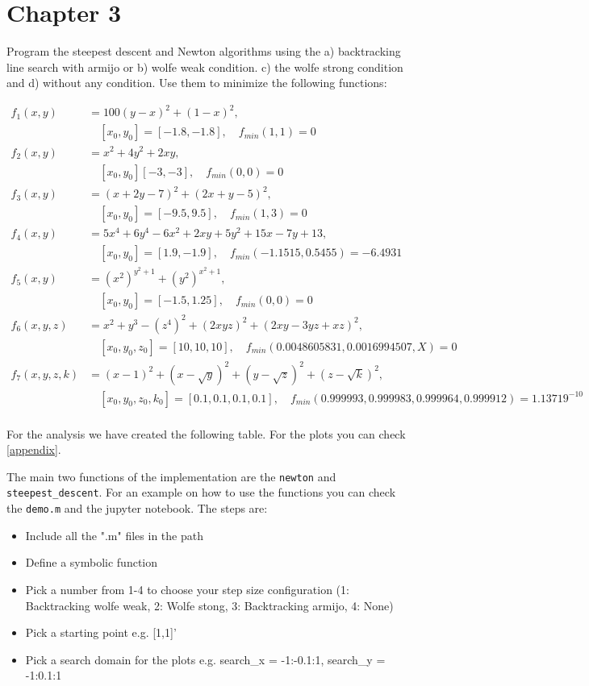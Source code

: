 \documentclass[a4paper,11pt]{article}
\numberwithin{equation}{section} %
\begin{document}
\pagebreak


\section{Chapter 3}

Program the steepest descent and Newton algorithms using the a) backtracking line search with armijo or b) wolfe weak condition. c) the wolfe strong condition and d) without any condition. Use them to minimize the following functions:

\begin{align*}
    f_1(x,y) &= 100 (y-x)^2 + (1-x)^2, \\ &\quad [x_0,y_0] = [-1.8,-1.8], \quad f_{min}(1,1)=0  \\
    f_2(x,y) &= x^2 + 4y^2 + 2xy, \\ & \quad [x_0,y_0] [-3,-3], \quad f_{min}(0,0) = 0 \\
    f_3(x,y) &= (x+2y-7)^2 + (2x+y-5)^2, \\ & \quad [x_0,y_0] = [-9.5,9.5], \quad f_{min}(1,3) = 0 \\
    f_4(x,y) &= 5x^4 + 6y^4 - 6x^2 + 2xy + 5y^2 + 15x -7y + 13, \\ & \quad [x_0,y_0] = [1.9,-1.9], \quad f_{min}(-1.1515,0.5455) = -6.4931 \\
    f_5(x,y) &= (x^2)^{y^2+1} + (y^2)^{x^2+1},\\ & \quad [x_0,y_0] = [-1.5,1.25], \quad f_{min}(0,0) = 0 \\
    f_6(x,y,z) &= x^2 + y^3 - (z^4)^2 + (2xyz)^2 + (2xy-3yz+xz)^2, \\ & \quad [x_0,y_0,z_0] = [10,10,10], \quad f_{min}(0.0048605831,0.0016994507,X) = 0 \\
    f_7(x,y,z,k) &= (x-1)^2 + (x-\sqrt{y})^2 + (y-\sqrt{z})^2 + (z-\sqrt{k})^2, \\ & \quad [x_0,y_0,z_0,k_0] = [0.1,0.1,0.1,0.1], \quad f_{min}(0.999993,0.999983,0.999964,0.999912) = 1.13719^{-10} \\
\end{align*}

For the analysis we have created the following table. For the plots you can check \ref{appendix}.

The main two functions of the implementation are the \verb|newton| and \verb|steepest_descent|. For an example on how to use the functions you can check the \verb|demo.m| and the jupyter notebook. The steps are:

\begin{itemize}
    \item Include all the ".m" files in the path
    \item Define a symbolic function
    \item Pick a number from 1-4 to choose your step size configuration (1: Backtracking wolfe weak, 2: Wolfe stong, 3: Backtracking armijo, 4: None)
    \item Pick a starting point e.g. [1,1]'
    \item Pick a search domain for the plots e.g. search\_x = -1:-0.1:1, search\_y = -1:0.1:1
\end{itemize}
\end{document}

